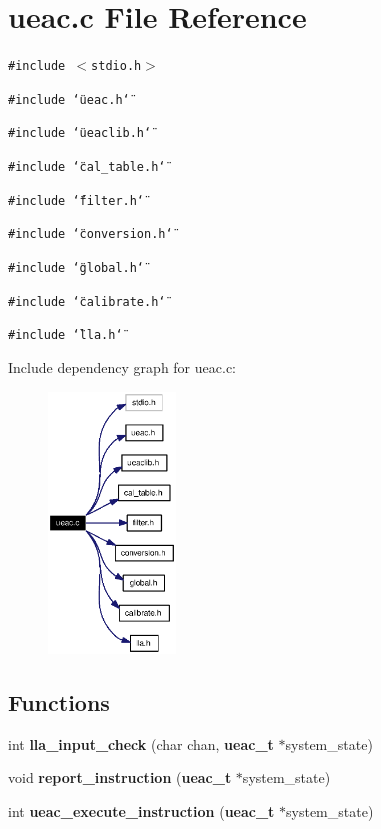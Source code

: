 \section{ueac.c File Reference}
\label{ueac_8c}
{\tt \#include $<$stdio.h$>$}\par
{\tt \#include \char`\"{}ueac.h\char`\"{}}\par
{\tt \#include \char`\"{}ueaclib.h\char`\"{}}\par
{\tt \#include \char`\"{}cal\_\-table.h\char`\"{}}\par
{\tt \#include \char`\"{}filter.h\char`\"{}}\par
{\tt \#include \char`\"{}conversion.h\char`\"{}}\par
{\tt \#include \char`\"{}global.h\char`\"{}}\par
{\tt \#include \char`\"{}calibrate.h\char`\"{}}\par
{\tt \#include \char`\"{}lla.h\char`\"{}}\par


Include dependency graph for ueac.c:\begin{figure}[H]
\begin{center}
\leavevmode
\includegraphics[width=96pt]{ueac_8c__incl}
\end{center}
\end{figure}
\subsection*{Functions}
\begin{CompactItemize}
\item 
int {\bf lla\_\-input\_\-check} (char chan, {\bf ueac\_\-t} $\ast$system\_\-state)
\item 
void {\bf report\_\-instruction} ({\bf ueac\_\-t} $\ast$system\_\-state)
\item 
int {\bf ueac\_\-execute\_\-instruction} ({\bf ueac\_\-t} $\ast$system\_\-state)
\end{CompactItemize}
